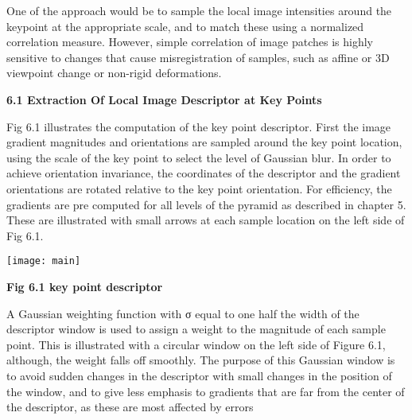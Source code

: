 \documentclass[12pt,a4paper]{report}
\begin{document}
\begin{flushleft}
\vspace{10 mm}

One of the approach would be to sample the local image intensities around the keypoint
at the appropriate scale, and to match these using a normalized correlation measure.
However, simple correlation of image patches is highly sensitive to changes that cause misregistration of samples, such as affine or 3D viewpoint change or non-rigid deformations.\par



\newpage


\textbf{6.1  Extraction Of Local Image Descriptor at Key Points}
\vspace{7mm}

Fig 6.1 illustrates the computation of the key point descriptor. First the image gradient magnitudes and orientations are sampled around the key point location, using the scale of the key point to select the level of Gaussian blur. In order to achieve orientation invariance, the coordinates of the descriptor and the gradient orientations are rotated relative to the key point orientation. For efficiency, the gradients are pre computed for all levels of the pyramid as described in chapter 5. These are illustrated with small arrows at each sample location on the left side of Fig 6.1.\par
\vspace{7mm}
\texttt{[image: main]}
\begin{center}\textbf{Fig 6.1 key point descriptor }\end{center}
\vspace{7 mm}


A Gaussian weighting function with  σ  equal to one half the width of the descriptor window is used to assign a weight to the magnitude of each sample point. This is illustrated with a circular window on the left side of Figure 6.1, although, the weight falls off smoothly. The purpose of this Gaussian window is to avoid sudden changes in the descriptor with small changes in the position of the window, and to give less emphasis to gradients that are far from the center of the descriptor, as these are most affected by errors

\newpage



\end{flushleft}
\end{document}
